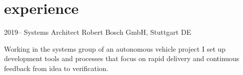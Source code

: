 \documentclass[]{friggeri-cv} %
\begin{document}

\section{\color{orange}experience}


\begin{entrylist}
\entry
{2019--}
{Systems Architect}
{Robert Bosch GmbH, Stuttgart DE}
{Working in the systems group of an autonomous vehicle project I set up development tools and processes that focus on rapid delivery and continuous feedback from idea to verification.

}
\end{entrylist}
\end{document}
